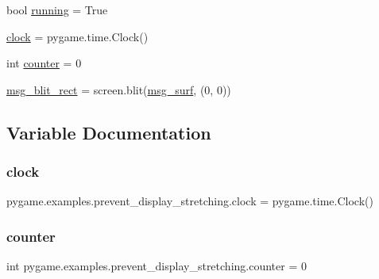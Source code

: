 \begin{DoxyCompactItemize}
\item 
bool \hyperlink{namespacepygame_1_1examples_1_1prevent__display__stretching_a1044502fc91fd281fc19ce657dadb9cb}{running} = True
\item 
\hyperlink{namespacepygame_1_1examples_1_1prevent__display__stretching_a6f1441757a0ae78565f3d9d0a6e6e18a}{clock} = pygame.\+time.\+Clock()
\item 
int \hyperlink{namespacepygame_1_1examples_1_1prevent__display__stretching_a416dc591af490919b6000f1cee208353}{counter} = 0
\item 
\hyperlink{namespacepygame_1_1examples_1_1prevent__display__stretching_ad3cec33e3a632e0b98be2dbd2a2ad73b}{msg\+\_\+blit\+\_\+rect} = screen.\+blit(\hyperlink{namespacepygame_1_1examples_1_1prevent__display__stretching_ad84b8dee76a22eaf19f3e21f8e2df9b8}{msg\+\_\+surf}, (0, 0))
\end{DoxyCompactItemize}


\subsection{Variable Documentation}
\mbox{\label{namespacepygame_1_1examples_1_1prevent__display__stretching_a6f1441757a0ae78565f3d9d0a6e6e18a}} 
\subsubsection{\texorpdfstring{clock}{clock}}
{\footnotesize\ttfamily pygame.\+examples.\+prevent\+\_\+display\+\_\+stretching.\+clock = pygame.\+time.\+Clock()}

\mbox{\label{namespacepygame_1_1examples_1_1prevent__display__stretching_a416dc591af490919b6000f1cee208353}} 
\subsubsection{\texorpdfstring{counter}{counter}}
{\footnotesize\ttfamily int pygame.\+examples.\+prevent\+\_\+display\+\_\+stretching.\+counter = 0}


